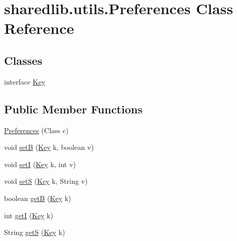 \hypertarget{classsharedlib_1_1utils_1_1_preferences}{}\section{sharedlib.\+utils.\+Preferences Class Reference}
\label{classsharedlib_1_1utils_1_1_preferences}
\subsection*{Classes}
\begin{DoxyCompactItemize}
\item 
interface \hyperlink{interfacesharedlib_1_1utils_1_1_preferences_1_1_key}{Key}
\end{DoxyCompactItemize}
\subsection*{Public Member Functions}
\begin{DoxyCompactItemize}
\item 
\hyperlink{classsharedlib_1_1utils_1_1_preferences_a520e4e33760f9323ca369f46a4a24297}{Preferences} (Class c)
\item 
void \hyperlink{classsharedlib_1_1utils_1_1_preferences_a6fd1a945420fbcc3702af8a3b961354c}{setB} (\hyperlink{interfacesharedlib_1_1utils_1_1_preferences_1_1_key}{Key} k, boolean v)
\item 
void \hyperlink{classsharedlib_1_1utils_1_1_preferences_a76c07b4fbea8dbe8c2ef21cf31cf57c3}{setI} (\hyperlink{interfacesharedlib_1_1utils_1_1_preferences_1_1_key}{Key} k, int v)
\item 
void \hyperlink{classsharedlib_1_1utils_1_1_preferences_ac2faaadd669dbfb98afd18cb2bd31871}{setS} (\hyperlink{interfacesharedlib_1_1utils_1_1_preferences_1_1_key}{Key} k, String v)
\item 
boolean \hyperlink{classsharedlib_1_1utils_1_1_preferences_a7859f4913ec148830aa827501fc5168a}{getB} (\hyperlink{interfacesharedlib_1_1utils_1_1_preferences_1_1_key}{Key} k)
\item 
int \hyperlink{classsharedlib_1_1utils_1_1_preferences_a28f7df716af43382a4380735617c5575}{getI} (\hyperlink{interfacesharedlib_1_1utils_1_1_preferences_1_1_key}{Key} k)
\item 
String \hyperlink{classsharedlib_1_1utils_1_1_preferences_ab04e20950816d085a9b8c07eed5edc73}{getS} (\hyperlink{interfacesharedlib_1_1utils_1_1_preferences_1_1_key}{Key} k)
\end{DoxyCompactItemize}



